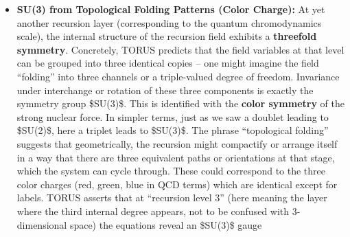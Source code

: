 \documentclass[
]{article}
\begin{document}
{\begin{itemize}
  attributes this to a \textbf{recursion harmonic acquiring a nonzero
  expectation} -- essentially a built-in ``Higgs mechanism'' where one
  of the recursion fields takes a constant value, breaking the
  symmetry\hspace{0pt}. The result is that \$SU(2)\_L
  \textbackslash times U(1)\emph{Y\$ breaks down to the remaining
  \$U(1)}\{\textbackslash text\{em\}\}\$ (electromagnetism), yielding
  three massive gauge bosons (\$W\^{}+, W\^{}-, Z\^{}0\$) and one
  massless photon, exactly as in the electroweak theory\hspace{0pt}. All
  of these details (like the values of coupling constants and the mixing
  angle) emerge from the recursion structure -- for example, the ratio
  of how the recursion fields split between the two components can
  determine the Weinberg angle of mixing\hspace{0pt}. The important
  takeaway is that \textbf{TORUS provides a group-theoretic proof that
  an \$SU(2)\$ symmetry must exist given a twofold recursion degeneracy}
  and that including a phase symmetry alongside yields the electroweak
  gauge group, which then follows the pattern of symmetry breaking
  consistent with observation.
\item
  \textbf{SU(3) from Topological Folding Patterns (Color Charge):} At
  yet another recursion layer (corresponding to the quantum
  chromodynamics scale), the internal structure of the recursion field
  exhibits a \textbf{threefold symmetry}. Concretely, TORUS predicts
  that the field variables at that level can be grouped into three
  identical copies -- one might imagine the field ``folding'' into three
  channels or a triple-valued degree of freedom\hspace{0pt}. Invariance
  under interchange or rotation of these three components is exactly the
  symmetry group \$SU(3)\$. This is identified with the \textbf{color
  symmetry} of the strong nuclear force. In simpler terms, just as we
  saw a doublet leading to \$SU(2)\$, here a triplet leads to \$SU(3)\$.
  The phrase ``topological folding'' suggests that geometrically, the
  recursion might compactify or arrange itself in a way that there are
  three equivalent paths or orientations at that stage, which the system
  can cycle through. These could correspond to the three color charges
  (red, green, blue in QCD terms) which are identical except for labels.
  TORUS asserts that at ``recursion level 3'' (here meaning the layer
  where the third internal degree appears, not to be confused with
  3-dimensional space) the equations reveal an \$SU(3)\$ gauge

\end{itemize}}
\end{document}
